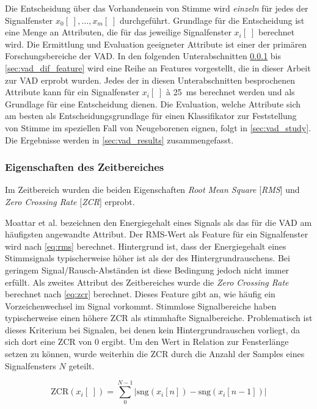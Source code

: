 Die Entscheidung über das Vorhandensein von Stimme wird \emph{einzeln} für jedes der Signalfenster $x_0[\;] , \ldots , x_m[\;]$ durchgeführt. Grundlage für die Entscheidung ist eine Menge an Attributen, die für das jeweilige Signalfenster $x_i[\;]$ berechnet wird. Die Ermittlung und Evaluation geeigneter Attribute ist einer der primären Forschungsbereiche der VAD. In den folgenden Unterabschnitten \ref{sec:vad_time_features} bis \ref{sec:vad_dif_feature} wird eine Reihe an Features vorgestellt, die in dieser Arbeit zur VAD erprobt wurden. Jedes der in diesen Unterabschnitten besprochenen Attribute kann für ein Signalfenster $x_i[\;]$ \`{a} \SI{25}{\milli\second} berechnet werden und als Grundlage für eine Entscheidung dienen. Die Evaluation, welche Attribute sich am besten als Entscheidungsgrundlage für einen Klassifikator zur Feststellung von Stimme im speziellen Fall von Neugeborenen eignen, folgt in \autoref{sec:vad_study}. Die Ergebnisse werden in \autoref{sec:vad_results} zusammengefasst.

\subsubsection{Eigenschaften des Zeitbereiches}
\label{sec:vad_time_features}

Im Zeitbereich wurden die beiden Eigenschaften \emph{Root Mean Square} [\emph{RMS}] und \emph{Zero Crossing Rate} [\emph{ZCR}] erprobt.

Moattar et al. \cite{vad_Easy} bezeichnen den Energiegehalt eines Signals als das für die VAD am häufigsten angewandte Attribut. Der RMS-Wert als Feature für ein Signalfenster wird nach \autoref{eq:rms} berechnet. Hintergrund ist, dass der Energiegehalt eines Stimmsignals typischerweise höher ist als der des Hintergrundrauschens. Bei geringem Signal/Rausch-Abständen ist diese Bedingung jedoch nicht immer erfüllt. Als zweites Attribut des Zeitbereiches wurde die \emph{Zero Crossing Rate} berechnet nach \autoref{eq:zcr} berechnet. Dieses Feature gibt an, wie häufig ein Vorzeichenwechsel im Signal vorkommt. Stimmlose Signalbereiche haben typischerweise einen höhere ZCR als stimmhafte Signalbereiche. Problematisch ist dieses Kriterium bei Signalen, bei denen kein Hintergrundrauschen vorliegt, da sich dort eine ZCR von 0 ergibt.\cite{vad_ceps} Um den Wert in Relation zur Fensterlänge setzen zu können, wurde weiterhin die ZCR durch die Anzahl der Samples eines Signalfensters $N$ geteilt.

\begin{equation}
\text{ZCR}(x_i[\;]) = \sum_{0}^{N-1}|\text{sng}(x_i[n])-\text{sng}(x_i[n-1])|
\label{eq:zcr}
\end{equation}

